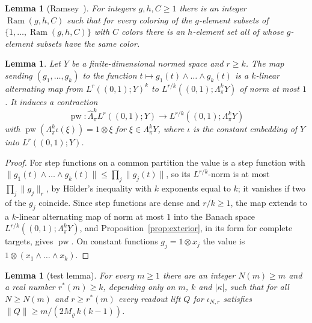 \documentclass[11pt]{amsart}
\newtheorem{lemma}[theorem]{Lemma}
\theoremstyle{definition}
\theoremstyle{remark}
\numberwithin{equation}{section}
\newcommand{\abs}[1]{\lvert #1\rvert}
\newcommand{\norm}[1]{\lVert #1\rVert}
\theoremstyle{plain}
\theoremstyle{definition}
\theoremstyle{plain}
\begin{document}
\begin{lemma}[Ramsey~{\cite[Theorem~B]{Ra}}]\label{rig:lem:ramsey}
For integers $g,h,C\ge1$ there is an integer $\operatorname{Ram}(g,h,C)$ such that for every coloring of the
$g$\nobreakdash-element subsets of $\{1,\dots,\operatorname{Ram}(g,h,C)\}$ with $C$ colors there is an
$h$\nobreakdash-element set all of whose $g$\nobreakdash-element subsets have the same color.
\end{lemma}

\begin{lemma}\label{rig:lem:wedge-readout}
Let $Y$ be a finite-dimensional normed space and $r\ge k$. The map sending $(g_1,\dots,g_k)$ to the function
$t\mapsto g_1(t)\wedge\dots\wedge g_k(t)$ is a $k$\nobreakdash-linear alternating map from $L^r((0,1);Y)^k$ to
$L^{r/k}((0,1);\Lambda^k_\pi Y)$ of norm at most $1$. It induces a contraction
\[
 \operatorname{pw}\colon\widehat\Lambda^k_\pi L^r((0,1);Y)\to L^{r/k}((0,1);\Lambda^k_\pi Y)
\]
with $\operatorname{pw}(\Lambda^k_\pi\iota(\xi))=1\otimes\xi$ for $\xi\in\Lambda^k_\pi Y$, where $\iota$ is the constant
embedding of $Y$ into $L^r((0,1);Y)$.
\end{lemma}

\begin{proof}
For step functions on a common partition the value is a step function with
$\norm{g_1(t)\wedge\dots\wedge g_k(t)}\le\prod_j\norm{g_j(t)}$, so its $L^{r/k}$\nobreakdash-norm is at most
$\prod_j\norm{g_j}_r$, by H\"older's inequality with $k$ exponents equal to $k$; it vanishes if two of the $g_j$
coincide. Since step functions are dense and $r/k\ge1$, the map extends to a $k$\nobreakdash-linear alternating map of
norm at most $1$ into the Banach space $L^{r/k}((0,1);\Lambda^k_\pi Y)$, and Proposition~\ref{prop:exterior}, in its
form for complete targets, gives $\operatorname{pw}$. On constant functions $g_j=1\otimes x_j$ the value is
$1\otimes(x_1\wedge\dots\wedge x_k)$.
\end{proof}

\begin{lemma}[test lemma]\label{rig:lem:test}
For every $m\ge1$ there are an integer $N(m)\ge m$ and a real number $r^*(m)\ge k$, depending only on $m$, $k$ and
$\abs\kappa$, such that for all $N\ge N(m)$ and $r\ge r^*(m)$ every readout lift $Q$ for $\iota_{N,r}$ satisfies
$\norm Q\ge m/(2M_\varrho\,k(k-1))$.
\end{lemma}
\end{document}
